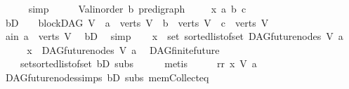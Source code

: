 \begin{isabellebody}
\ \ \ \ \isamarkupfalse%
\ simp\isanewline
{}\isamarkupfalse%
\ \isanewline
\ \ \isamarkupfalse%
\ V{\isacharcolon}{\kern0pt}{\isacharcolon}{\kern0pt}{\isachardoublequoteopen}{\isacharparenleft}{\kern0pt}{\isacharprime}{\kern0pt}a{\isacharcolon}{\kern0pt}{\isacharcolon}{\kern0pt}linorder{\isacharcomma}{\kern0pt}\ {\isacharprime}{\kern0pt}b{\isacharparenright}{\kern0pt}\ pre{\isacharunderscore}{\kern0pt}digraph{\isachardoublequoteclose}\ \isanewline
\ \ \isamarkupfalse%
\ x\ a\ b\ c\isanewline
\ \ \isamarkupfalse%
\ bD{\isacharcolon}{\kern0pt}\ {\isachardoublequoteopen}\ {\isasymnot}\ {\isacharparenleft}{\kern0pt}{\isasymnot}\ blockDAG\ V\ {\isasymor}\ a\ {\isasymnotin}\ verts\ V\ {\isasymor}\ b\ {\isasymnotin}\ verts\ V\ {\isasymor}\ c\ {\isasymnotin}\ verts\ V{\isacharparenright}{\kern0pt}{\isachardoublequoteclose}\isanewline
\ \ \isamarkupfalse%
\ \isamarkupfalse%
\ a{\isacharunderscore}{\kern0pt}in{\isacharcolon}{\kern0pt}\ {\isachardoublequoteopen}a\ {\isasymin}\ verts\ V{\isachardoublequoteclose}\ \isamarkupfalse%
\ bD\ \isamarkupfalse%
\ simp\isanewline
\ \ \isamarkupfalse%
\ {\isachardoublequoteopen}x\ {\isasymin}\ set\ {\isacharparenleft}{\kern0pt}sorted{\isacharunderscore}{\kern0pt}list{\isacharunderscore}{\kern0pt}of{\isacharunderscore}{\kern0pt}set\ {\isacharparenleft}{\kern0pt}DAG{\isachardot}{\kern0pt}future{\isacharunderscore}{\kern0pt}nodes\ V\ a{\isacharparenright}{\kern0pt}{\isacharparenright}{\kern0pt}{\isachardoublequoteclose}\isanewline
\ \ \isamarkupfalse%
\ \isamarkupfalse%
\ {\isachardoublequoteopen}x\ {\isasymin}\ DAG{\isachardot}{\kern0pt}future{\isacharunderscore}{\kern0pt}nodes\ V\ a{\isachardoublequoteclose}\ \isamarkupfalse%
\ DAG{\isachardot}{\kern0pt}finite{\isacharunderscore}{\kern0pt}future\isanewline
\ \ \ \ set{\isacharunderscore}{\kern0pt}sorted{\isacharunderscore}{\kern0pt}list{\isacharunderscore}{\kern0pt}of{\isacharunderscore}{\kern0pt}set\ bD\ subs\isanewline
\ \ \ \ \isamarkupfalse%
\ metis\isanewline
\ \ \isamarkupfalse%
\ \isamarkupfalse%
\ rr{\isacharcolon}{\kern0pt}\ {\isachardoublequoteopen}x\ {\isasymrightarrow}\isactrlsup {\isacharplus}{\kern0pt}\isactrlbsub V\isactrlesub \ a{\isachardoublequoteclose}\ \isamarkupfalse%
\ DAG{\isachardot}{\kern0pt}future{\isacharunderscore}{\kern0pt}nodes{\isachardot}{\kern0pt}simps\ bD\ subs\ mem{\isacharunderscore}{\kern0pt}Collect{\isacharunderscore}{\kern0pt}eq\isanewline

\end{isabellebody}
